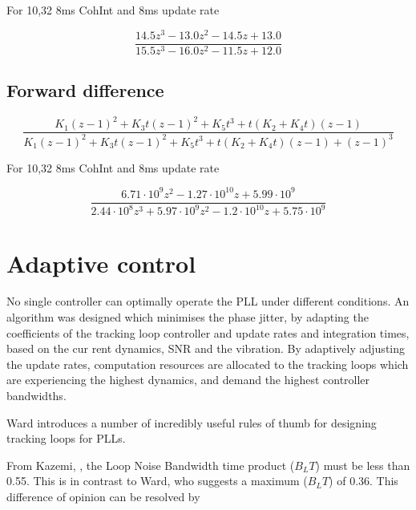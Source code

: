 For 10,32 8ms CohInt and 8ms update rate



\begin{equation}
\frac{14.5 z^{3} - 13.0 z^{2} - 14.5 z + 13.0}{15.5 z^{3} - 16.0 z^{2} - 11.5 z + 12.0}\end{equation}
\clearpage

\subsection{Forward difference}

\begin{equation}
\frac{K_{1} \left(z - 1\right)^{2} + K_{3} t \left(z - 1\right)^{2} + K_{5} t^{3} + t \left(K_{2} + K_{4} t\right) \left(z - 1\right)}{K_{1} \left(z - 1\right)^{2} + K_{3} t \left(z - 1\right)^{2} + K_{5} t^{3} + t \left(K_{2} + K_{4} t\right) \left(z - 1\right) + \left(z - 1\right)^{3}}
\end{equation}


For 10,32 8ms CohInt and 8ms update rate

\begin{equation}
\frac{6.71 \cdot 10^{9} z^{2} - 1.27 \cdot 10^{10} z + 5.99 \cdot 10^{9}}{2.44 \cdot 10^{8} z^{3} + 5.97 \cdot 10^{9} z^{2} - 1.2 \cdot 10^{10} z + 5.75 \cdot 10^{9}}
\end{equation}


\clearpage


\section{Adaptive control}

No single controller can
optimally operate the PLL
under different conditions.
An algorithm was designed
which minimises the phase
jitter, by adapting the
coefficients of the tracking
loop controller and update
rates and integration times,
based on the cur rent
dynamics, SNR and the
vibration.
By adaptively adjusting the update rates, computation resources
are allocated to the tracking loops which are experiencing the
highest dynamics, and demand the highest controller
bandwidths.


Ward introduces a number of incredibly useful rules of thumb for designing tracking loops for PLLs. 

From Kazemi, \cite{Kazemi2008}, the Loop Noise Bandwidth time product ($B_L T$) must be less than 0.55.
This is in contrast to Ward, who suggests a maximum  ($B_L T$) of 0.36. This difference of opinion can be resolved by 


